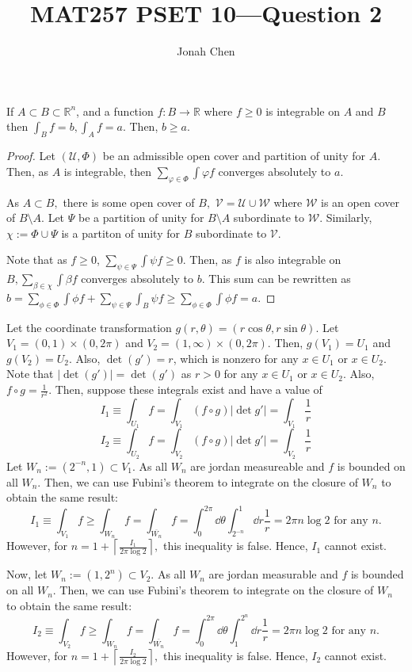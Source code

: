 \documentclass{exam}
\title{MAT257 PSET 10---Question 2}
\author{Jonah Chen}
\date{}
\numberwithin{equation}{section}
\newcommand{\R}{\mathbb{R}}
\begin{document}
    \sffamily
    \maketitle
    \begin{lemma}
        If \(A\subset B\subset\R^n\), and a function \(f:B\to\R\) where \(f\geq0\) is integrable on \(A\) and \(B\) then \(\int_Bf=b,\int_Af=a.\) Then, \(b\geq a.\)
        \begin{proof}
            Let \((\mathcal U,\Phi)\) be an admissible open cover and partition of unity for \(A.\) Then, as \(A\) is integrable, then \(\sum_{\varphi\in\Phi}\int\varphi f\) converges absolutely to \(a.\)
            
            \vspace{10pt}

            As \(A\subset B,\) there is some open cover of \(B,\) \(\mathcal V=\mathcal U\cup\mathcal W\) where \(\mathcal W\) is an open cover of \(B\setminus A\). Let \(\Psi\) be a partition of unity for \(B\setminus A\) subordinate to \(\mathcal W.\) Similarly, \(\chi:=\Phi\cup\Psi\) is a partiton of unity for \(B\) subordinate to \(\mathcal V.\)

            \vspace{10pt}

            Note that as \(f\geq0\), \(\sum_{\psi\in\Psi}\int\psi f\geq 0\). Then, as \(f\) is also integrable on \(B,\sum_{\beta\in\chi}\int\beta f\) converges absolutely to \(b.\)  This sum can be rewritten as \(b=\sum_{\phi\in\Phi}\int\phi f+\sum_{\psi\in\Psi}\int_B\psi f\geq\sum_{\phi\in\Phi}\int\phi f=a.\)
        \end{proof} 
    \end{lemma}
    Let the coordinate transformation $g(r,\theta)=(r\cos\theta,r\sin\theta)$. Let $V_1=(0,1)\times(0,2\pi)$ and $V_2=(1,\infty)\times(0,2\pi)$. Then, \(g(V_1)=U_1\) and \(g(V_2)=U_2\). Also, \(\det(g')=r\), which is nonzero for any \(x\in U_1\) or \(x\in U_2\). Note that \(|\det(g')|=\det(g')\) as \(r>0\) for any \(x\in U_1\) or \(x\in U_2\). Also, \(f\circ g=\frac{1}{r^2}.\) Then, suppose these integrals exist and have a value of
    \[I_1\equiv\int_{U_1}f=\int_{V_1}(f\circ g)|\det g'|=\int_{V_1}\frac{1}{r}\]
    \[I_2\equiv\int_{U_2}f=\int_{V_2}(f\circ g)|\det g'|=\int_{V_2}\frac{1}{r}\]
    Let \(W_n:=(2^{-n},1)\subset V_1.\) As all \(W_n\) are jordan measureable and \(f\) is bounded on all \(W_n.\) Then, we can use Fubini's theorem to integrate on the closure of \(W_n\) to obtain the same result:
    \[I_1\equiv\int_{V_1}f\geq\int_{W_n}f=\int_{\overline{W_n}}f=\int_0^{2\pi}\dd\theta\int_{2^{-n}}^1\dd r\frac{1}{r}=2\pi n\log 2\text{ for any }n.\]
    However, for \(n=1+\left\lceil\frac{I_1}{2\pi\log 2}\right\rceil,\) this inequality is false. Hence, \(I_1\) cannot exist.

    Now, let \(W_n:=(1,2^n)\subset V_2.\) As all \(W_n\) are jordan measurable and \(f\) is bounded on all \(W_n\). Then, we can use Fubini's theorem to integrate on the closure of \(W_n\) to obtain the same result:
    \[I_2\equiv\int_{V_2}f\geq\int_{W_n}f=\int_{\overline{W_n}}f=\int_0^{2\pi}\dd\theta\int_{1}^{2^n}\dd r\frac{1}{r}=2\pi n\log 2 \text{ for any }n.\]
    However, for \(n=1+\left\lceil\frac{I_2}{2\pi\log 2}\right\rceil,\) this inequality is false. Hence, \(I_2\) cannot exist.
\end{document}
